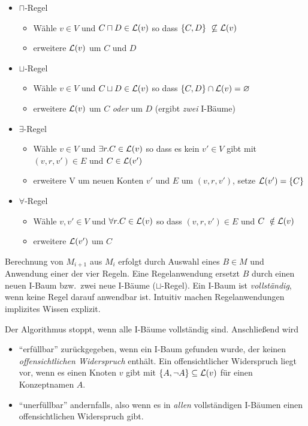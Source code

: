 \begin{itemize}
\item $\sqcap$-Regel
  \begin{itemize}
  \item
    Wähle $v \in V$ und $C \sqcap D \in \ML\left( v \right)$ so dass
    $\left\{ C,D \right\}\  \not\subseteq \ML\left( v \right)$
  \item
    erweitere $\mathcal{L}(v)$ um $C$ und $D$
  \end{itemize}
\item $\sqcup$-Regel

  \begin{itemize}
  \item
    Wähle $v \in V$ und $C \sqcup D \in \ML\left( v \right)$ so dass
    $\left\{ C,D \right\} \cap \ML\left( v \right) = \emptyset$
  \item
      erweitere $\mathcal{L}(v)$ um $C$ \emph{oder} um $D$ (ergibt \emph{zwei} I-Bäume)
  \end{itemize}
\item $\exists$-Regel

  \begin{itemize}
  \item
    Wähle $v \in V$ und $\exists r.C \in \ML\left( v \right)$ so dass
    es kein $v' \in V$ gibt mit $\left( v,r,v' \right) \in E$
    und $C \in \ML\left( v' \right)$
  \item
    erweitere V um neuen Konten $v'$ und $E$ um
    $\left( v,r,v' \right)$, setze
    $\ML\left( v' \right) = \left\{ C \right\}$
  \end{itemize}
\item $\forall$-Regel
  \begin{itemize}
  \item
    Wähle $v,v' \in V$ und $\forall r.C \in \ML\left( v \right)$ so
    dass $\left( v,r,v' \right) \in E$ und
    $C\  \notin \ML\left( v \right)$
  \item
    erweitere $\mathcal{L}(v')$ um $C$
  \end{itemize}
\end{itemize}

Berechnung von $M_{i + 1}$ aus $M_i$ erfolgt durch Auswahl eines $B \in M$ und
Anwendung einer der vier Regeln. Eine Regelanwendung ersetzt $B$ durch einen
neuen I-Baum bzw.\ zwei neue I-Bäume ($\sqcup$-Regel). Ein I-Baum ist \emph{vollständig}, wenn keine Regel darauf anwendbar ist. Intuitiv machen Regelanwendungen implizites Wissen explizit.

Der Algorithmus stoppt, wenn alle I-Bäume vollständig sind. Anschließend wird
\begin{itemize}
    \item \enquote{erfüllbar} zurückgegeben, wenn ein I-Baum gefunden wurde, der keinen \emph{offensichtlichen Widerspruch} enthält. Ein offensichtlicher Widerspruch liegt vor, wenn es einen Knoten $v$ gibt mit $\left\{A, \neg A\right\} \subseteq \ML(v)$ für einen Konzeptnamen $A$.
    \item \enquote{unerfüllbar} andernfalls, also wenn es in \emph{allen} vollständigen I-Bäumen einen offensichtlichen Widerspruch gibt.
\end{itemize}

